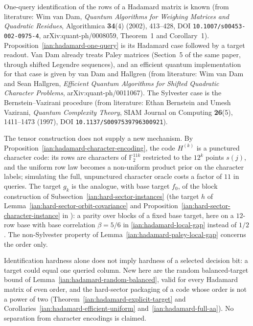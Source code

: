 \begin{remark}
\label{ian:hadamard-literature-comparison}
One-query identification of the rows of a Hadamard matrix is known (from literature: Wim van Dam, \emph{Quantum Algorithms for Weighing Matrices and Quadratic Residues}, Algorithmica \textbf{34}(4) (2002), 413--428, DOI \texttt{10.1007/s00453-002-0975-4}, arXiv:quant-ph/0008059, Theorem~1 and Corollary~1). Proposition~\ref{ian:hadamard-one-query} is its Hadamard case followed by a target readout. Van Dam already treats Paley matrices (Section~5 of the same paper, through shifted Legendre sequences), and an efficient quantum implementation for that case is given by van Dam and Hallgren (from literature: Wim van Dam and Sean Hallgren, \emph{Efficient Quantum Algorithms for Shifted Quadratic Character Problems}, arXiv:quant-ph/0011067). The Sylvester case is the Bernstein--Vazirani procedure (from literature: Ethan Bernstein and Umesh Vazirani, \emph{Quantum Complexity Theory}, SIAM Journal on Computing \textbf{26}(5), 1411--1473 (1997), DOI \texttt{10.1137/S0097539796300921}).

The tensor construction does not supply a new mechanism. By Proposition~\ref{ian:hadamard-character-encoding}, the code \(H^{(k)}\) is a punctured character code: its rows are characters of \(\mathbb F_2^{11k}\) restricted to the \(12^k\) points \(s(j)\), and the uniform row law becomes a non-uniform product prior on the character labels; simulating the full, unpunctured character oracle costs a factor of \(11\) in queries. The target \(g_k\) is the analogue, with base target \(f_0\), of the block construction of Subsection~\ref{ian:hard-sector-instances} (the target \(h\) of Lemma~\ref{ian:hard-sector-orbit-covariance} and Proposition~\ref{ian:hard-sector-character-instance} in ): a parity over blocks of a fixed base target, here on a \(12\)-row base with base correlation \(\beta=5/6\) in \eqref{ian:hadamard-local-gap} instead of \(1/2\). The non-Sylvester property of Lemma~\ref{ian:hadamard-paley-local-gap} concerns the order only.

Identification hardness alone does not imply hardness of a selected decision bit: a target could equal one queried column. New here are the random balanced-target bound of Lemma~\ref{ian:hadamard-random-balanced}, valid for every Hadamard matrix of even order, and the hard-sector packaging of a code whose order is not a power of two (Theorem~\ref{ian:hadamard-explicit-target} and Corollaries~\ref{ian:hadamard-efficient-uniform} and~\ref{ian:hadamard-full-aa}). No separation from character encodings is claimed.
\end{remark}

